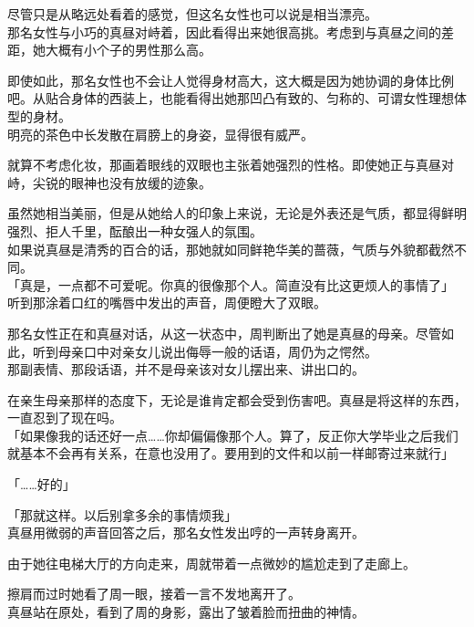 尽管只是从略远处看着的感觉，但这名女性也可以说是相当漂亮。\\

那名女性与小巧的真昼对峙着，因此看得出来她很高挑。考虑到与真昼之间的差距，她大概有小个子的男性那么高。

即使如此，那名女性也不会让人觉得身材高大，这大概是因为她协调的身体比例吧。从贴合身体的西装上，也能看得出她那凹凸有致的、匀称的、可谓女性理想体型的身材。\\

明亮的茶色中长发散在肩膀上的身姿，显得很有威严。

就算不考虑化妆，那画着眼线的双眼也主张着她强烈的性格。即使她正与真昼对峙，尖锐的眼神也没有放缓的迹象。

虽然她相当美丽，但是从她给人的印象上来说，无论是外表还是气质，都显得鲜明强烈、拒人千里，酝酿出一种女强人的氛围。\\

如果说真昼是清秀的百合的话，那她就如同鲜艳华美的蔷薇，气质与外貌都截然不同。\\

「真是，一点都不可爱呢。你真的很像那个人。简直没有比这更烦人的事情了」\\

听到那涂着口红的嘴唇中发出的声音，周便瞪大了双眼。

那名女性正在和真昼对话，从这一状态中，周判断出了她是真昼的母亲。尽管如此，听到母亲口中对亲女儿说出侮辱一般的话语，周仍为之愕然。\\

那副表情、那段话语，并不是母亲该对女儿摆出来、讲出口的。

在亲生母亲那样的态度下，无论是谁肯定都会受到伤害吧。真昼是将这样的东西，一直忍到了现在吗。\\

「如果像我的话还好一点……你却偏偏像那个人。算了，反正你大学毕业之后我们就基本不会再有关系，在意也没用了。要用到的文件和以前一样邮寄过来就行」

「……好的」

「那就这样。以后别拿多余的事情烦我」\\

真昼用微弱的声音回答之后，那名女性发出哼的一声转身离开。

由于她往电梯大厅的方向走来，周就带着一点微妙的尴尬走到了走廊上。

擦肩而过时她看了周一眼，接着一言不发地离开了。\\

真昼站在原处，看到了周的身影，露出了皱着脸而扭曲的神情。\\

